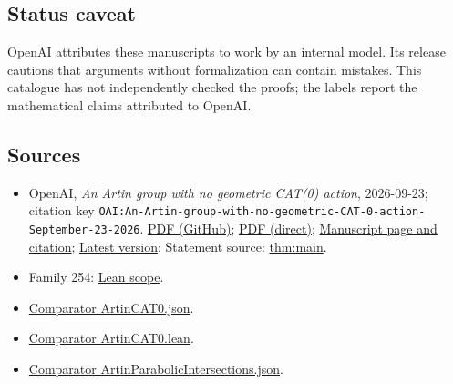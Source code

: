 \documentclass[11pt]{article}
\begin{document}
\subsection{Status caveat}
OpenAI attributes these manuscripts to work by an internal model. Its release cautions that arguments without formalization can contain mistakes. This catalogue has not independently checked the proofs; the labels report the mathematical claims attributed to OpenAI.

\subsection{Sources}
\begin{itemize}
\item OpenAI, \emph{An Artin group with no geometric CAT(0) action}, 2026-09-23; citation key \texttt{OAI:An-Artin-group-with-no-geometric-CAT-0-action-September-23-2026}. \href{https://github.com/openai/math/blob/adc7f1241b42e322a6451854ab7e4b4c146bf78a/preprints/An-Artin-group-with-no-geometric-CAT-0-action-September-23-2026/paper.pdf}{PDF (GitHub)}; \href{https://github.com/openai/math/raw/adc7f1241b42e322a6451854ab7e4b4c146bf78a/preprints/An-Artin-group-with-no-geometric-CAT-0-action-September-23-2026/paper.pdf}{PDF (direct)}; \href{https://github.com/openai/math/blob/adc7f1241b42e322a6451854ab7e4b4c146bf78a/preprints/An-Artin-group-with-no-geometric-CAT-0-action-September-23-2026/README.md}{Manuscript page and citation}; \href{https://github.com/openai/math/blob/main/preprints/An-Artin-group-with-no-geometric-CAT-0-action-September-23-2026/paper.pdf}{Latest version}; Statement source: \href{https://github.com/openai/math/blob/adc7f1241b42e322a6451854ab7e4b4c146bf78a/preprints/An-Artin-group-with-no-geometric-CAT-0-action-September-23-2026/build/sections/introduction.tex\#L61}{thm:main}.
\item Family 254: \href{https://github.com/openai/math/blob/adc7f1241b42e322a6451854ab7e4b4c146bf78a/lean/docs/254.md}{Lean scope}.
\item \href{https://github.com/openai/math/blob/adc7f1241b42e322a6451854ab7e4b4c146bf78a/lean/ComparatorChallenges/ArtinCAT0.json}{Comparator ArtinCAT0.json}.
\item \href{https://github.com/openai/math/blob/adc7f1241b42e322a6451854ab7e4b4c146bf78a/lean/ComparatorChallenges/ArtinCAT0.lean}{Comparator ArtinCAT0.lean}.
\item \href{https://github.com/openai/math/blob/adc7f1241b42e322a6451854ab7e4b4c146bf78a/lean/ComparatorChallenges/ArtinParabolicIntersections.json}{Comparator ArtinParabolicIntersections.json}.

\end{itemize}
\end{document}
